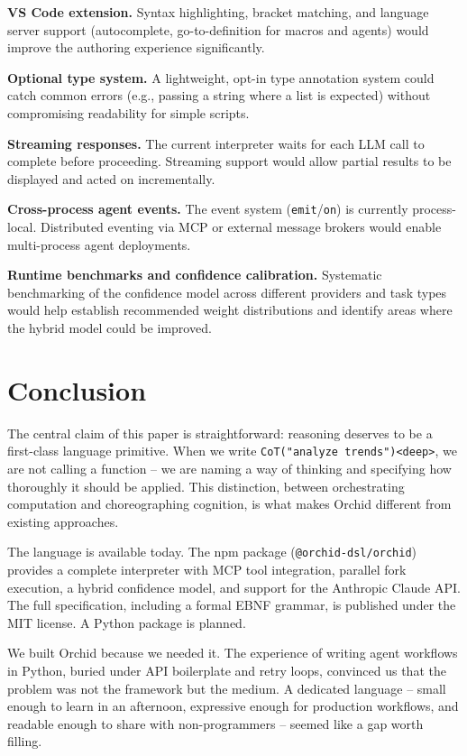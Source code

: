 \documentclass[11pt,a4paper]{article}
\begin{document}
\textbf{VS Code extension.} Syntax highlighting, bracket matching, and language server support (autocomplete, go-to-definition for macros and agents) would improve the authoring experience significantly.

\textbf{Optional type system.} A lightweight, opt-in type annotation system could catch common errors (e.g., passing a string where a list is expected) without compromising readability for simple scripts.

\textbf{Streaming responses.} The current interpreter waits for each LLM call to complete before proceeding. Streaming support would allow partial results to be displayed and acted on incrementally.

\textbf{Cross-process agent events.} The event system (\texttt{emit}/\texttt{on}) is currently process-local. Distributed eventing via MCP or external message brokers would enable multi-process agent deployments.

\textbf{Runtime benchmarks and confidence calibration.} Systematic benchmarking of the confidence model across different providers and task types would help establish recommended weight distributions and identify areas where the hybrid model could be improved.

\section{Conclusion}

The central claim of this paper is straightforward: reasoning deserves to be a first-class language primitive. When we write \texttt{CoT("analyze trends")<deep>}, we are not calling a function -- we are naming a way of thinking and specifying how thoroughly it should be applied. This distinction, between orchestrating computation and choreographing cognition, is what makes Orchid different from existing approaches.

The language is available today. The npm package (\texttt{@orchid-dsl/orchid}) provides a complete interpreter with MCP tool integration, parallel fork execution, a hybrid confidence model, and support for the Anthropic Claude API. The full specification, including a formal EBNF grammar, is published under the MIT license. A Python package is planned.

We built Orchid because we needed it. The experience of writing agent workflows in Python, buried under API boilerplate and retry loops, convinced us that the problem was not the framework but the medium. A dedicated language -- small enough to learn in an afternoon, expressive enough for production workflows, and readable enough to share with non-programmers -- seemed like a gap worth filling.
\end{document}
